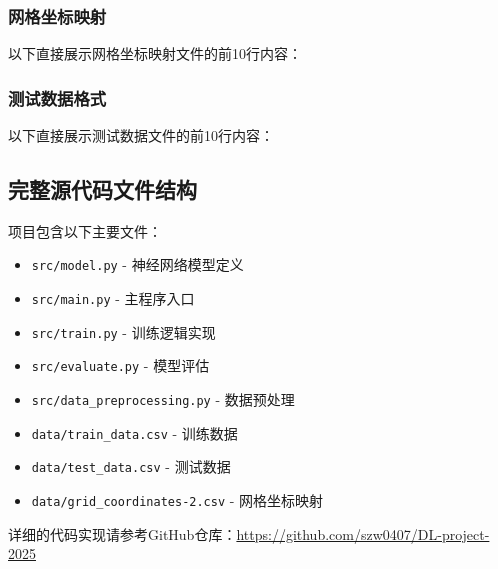 \documentclass{article}
\begin{document}
\subsubsection{网格坐标映射}
以下直接展示网格坐标映射文件的前10行内容：

\subsubsection{测试数据格式}
以下直接展示测试数据文件的前10行内容：

\subsection{完整源代码文件结构}

项目包含以下主要文件：

\begin{itemize}
    \item \texttt{src/model.py} - 神经网络模型定义
    \item \texttt{src/main.py} - 主程序入口
    \item \texttt{src/train.py} - 训练逻辑实现
    \item \texttt{src/evaluate.py} - 模型评估
    \item \texttt{src/data\_preprocessing.py} - 数据预处理
    \item \texttt{data/train\_data.csv} - 训练数据
    \item \texttt{data/test\_data.csv} - 测试数据
    \item \texttt{data/grid\_coordinates-2.csv} - 网格坐标映射
\end{itemize}

详细的代码实现请参考GitHub仓库：\url{https://github.com/szw0407/DL-project-2025}
\end{document}
